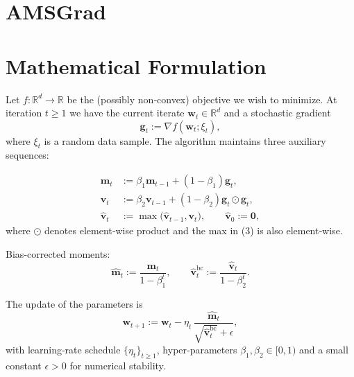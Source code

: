\documentclass{article}
\begin{document}
\section*{AMSGrad}

\section*{Mathematical Formulation}
Let $f:\mathbb{R}^d\to\mathbb{R}$ be the (possibly non‑convex) objective we wish to minimize.
At iteration $t\ge 1$ we have the current iterate $\mathbf{w}_t\in\mathbb{R}^d$ and a stochastic gradient
\[
\mathbf{g}_t:=\nabla f(\mathbf{w}_t;\xi_t),
\]
where $\xi_t$ is a random data sample.  
The algorithm maintains three auxiliary sequences:

\begin{align}
\mathbf{m}_t &:= \beta_1 \mathbf{m}_{t-1} + (1-\beta_1)\mathbf{g}_t, \tag{1}\\[4pt]
\mathbf{v}_t &:= \beta_2 \mathbf{v}_{t-1} + (1-\beta_2)\mathbf{g}_t\odot\mathbf{g}_t, \tag{2}\\[4pt]
\widehat{\mathbf{v}}_t &:= \max\bigl(\widehat{\mathbf{v}}_{t-1},\mathbf{v}_t\bigr), \qquad
\widehat{\mathbf{v}}_0:=\mathbf{0}, \tag{3}
\end{align}
where $\odot$ denotes element‑wise product and the max in (3) is also element‑wise.

Bias‑corrected moments:
\[
\widehat{\mathbf{m}}_t:=\frac{\mathbf{m}_t}{1-\beta_1^t},\qquad 
\widehat{\mathbf{v}}_t^{\mathrm{bc}}:=\frac{\widehat{\mathbf{v}}_t}{1-\beta_2^t}.
\]

The update of the parameters is
\[
\mathbf{w}_{t+1}:=\mathbf{w}_t-\eta_t\,
\frac{\widehat{\mathbf{m}}_t}{\sqrt{\widehat{\mathbf{v}}_t^{\mathrm{bc}}}+\epsilon},
\tag{4}
\]
with learning‑rate schedule $\{\eta_t\}_{t\ge1}$, hyper‑parameters
$\beta_1,\beta_2\in[0,1)$ and a small constant $\epsilon>0$ for numerical stability.
\end{document}
